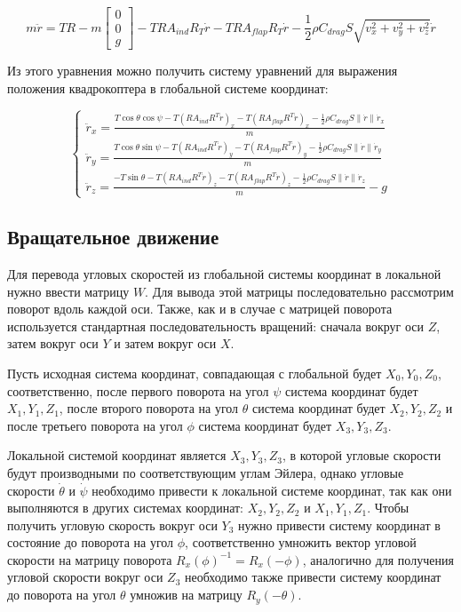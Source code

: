 \begin{equation}
m \ddot{r} =
T R - m \begin{bmatrix} 0 \\ 0 \\ g \end{bmatrix} - T R A_{ind} R_T \dot{r} - T R A_{flap} R_T \dot{r} -  \frac{1}{2} \rho C_{drag} S \sqrt{v_x^2 + v_y^2 + v_z^2} \dot{r}
\end{equation}

Из этого уравнения можно получить систему уравнений для выражения положения квадрокоптера в глобальной системе координат:

\begin{equation}
\begin{cases}
    \ddot{r}_x = \frac{T \cos\theta \cos\psi - T (R A_{ind} R^T \dot{r})_x - T (R A_{flap} R^T \dot{r})_x - \frac{1}{2} \rho C_{drag} S \|\dot{r}\| \dot{r}_x}{m} \\
    \ddot{r}_y = \frac{T \cos\theta \sin\psi - T (R A_{ind} R^T \dot{r})_y - T (R A_{flap} R^T \dot{r})_y - \frac{1}{2} \rho C_{drag} S \|\dot{r}\| \dot{r}_y}{m} \\
    \ddot{r}_z = \frac{-T \sin\theta - T (R A_{ind} R^T \dot{r})_z - T (R A_{flap} R^T \dot{r})_z - \frac{1}{2} \rho C_{drag} S \|\dot{r}\| \dot{r}_z}{m} - g
\end{cases}
\end{equation}

\subsection{Вращательное движение}

Для перевода угловых скоростей из глобальной системы координат в локальной  
нужно ввести матрицу \(W\). Для вывода этой матрицы последовательно рассмотрим поворот вдоль каждой оси.
Также, как и в случае с матрицей поворота используется стандартная последовательность вращений: сначала вокруг оси
\(Z\), затем вокруг оси \(Y\) и затем вокруг оси \(X\).

Пусть исходная система координат, совпадающая с глобальной будет \(X_0, Y_0, Z_0\), соответственно, 
после первого поворота на угол \(\psi\) система координат будет \(X_1, Y_1, Z_1\), после второго поворота
на угол \(\theta\) система координат будет \(X_2, Y_2, Z_2\) и после третьего поворота на угол \(\phi\)
система координат будет \(X_3, Y_3, Z_3\).

Локальной системой координат является \(X_3, Y_3, Z_3\), в которой угловые скорости будут производными по
соответствующим углам Эйлера, однако угловые скорости \(\dot{\theta}\) и \(\dot{\psi}\) необходимо привести к 
локальной системе координат, так как они выполняются в других системах координат: \(X_2, Y_2, Z_2\) и \(X_1, Y_1, Z_1\).
Чтобы получить угловую скорость вокруг оси \(Y_3\) нужно привести систему координат в состояние до поворота на угол \(\phi\),
соответственно умножить вектор угловой скорости на матрицу поворота \(R_x(\phi)^{-1}=R_x(-\phi)\), аналогично для получения
угловой скорости вокруг оси \(Z_3\) необходимо также привести систему координат до поворота на угол \(\theta\) умножив на матрицу \(R_y(-\theta)\).

